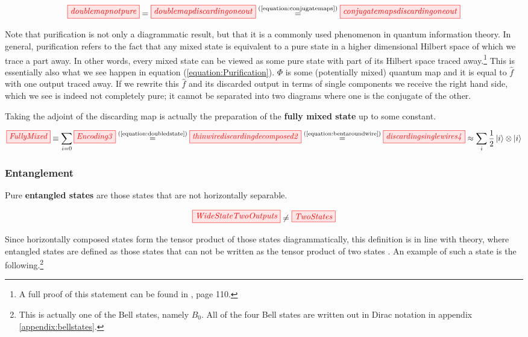 \documentclass[]{article}
\newcommand{\equaltext}[1]{\ensuremath{\stackrel{\text{#1}}{=}}}
\begin{document}
\begin{equation}
\label{equation:Purification}
\tikzfig{doublemapnotpure} = \tikzfig{doublemapdiscardingoneout} \equaltext{(\ref{equation:conjugatemaps})} \tikzfig{conjugatemapsdiscardingoneout}
\end{equation}

Note that purification is not only a diagrammatic result, but that it is a commonly used phenomenon in quantum information theory. In general, purification refers to the fact that any mixed state is equivalent to a pure state in a higher dimensional Hilbert space of which we trace a part away. In other words, every mixed state can be viewed as some pure state with part of its Hilbert space traced away.\footnote{ A full proof of this statement can be found in \cite{Nielsen2011}, page 110.} This is essentially also what we see happen in equation (\ref{equation:Purification}). $\Phi$ is some (potentially mixed) quantum map and it is equal to $\hat{f}$ with one output traced away. If we rewrite this $\hat{f}$ and its discarded output in terms of single components we receive the right hand side, which we see is indeed not completely pure; it cannot be separated into two diagrams where one is the conjugate of the other.

Taking the adjoint of the discarding map is actually the preparation of the \textbf{fully mixed state} up to some constant.

\begin{equation}
	\label{equation:FullyMixed}
	\tikzfig{FullyMixed} \equiv \sum\limits_{i=0} \tikzfig{Encoding3} \equaltext{(\ref{equation:doubledstate})} \tikzfig{thinwirediscardingdecomposed2}  \equaltext{(\ref{equation:bentaroundwire})} \tikzfig{discardingsinglewires4} \approx \sum\limits_{i} \frac{1}{2} \ket{i} \otimes \ket{i}
\end{equation}

\subsubsection{Entanglement}
\label{entanglement}
Pure \textbf{entangled states} are those states that are not horizontally separable.

\begin{equation}
\tikzfig{WideStateTwoOutputs} \neq \tikzfig{TwoStates}
\end{equation}

Since horizontally composed states form the tensor product of those states diagrammatically, this definition is in line with theory, where entangled states are defined as those states that can not be written as the tensor product of two states \cite{Nielsen2011}. An example of such a state is the following.\footnote{This is actually one of the Bell states, namely $B_0$. All of the four Bell states are written out in Dirac notation in appendix \ref{appendix:bellstates}.}
\end{document}
